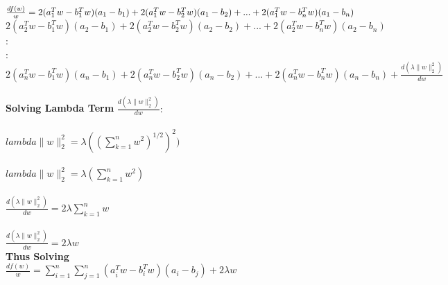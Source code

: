 \documentclass[12pt,letterpaper]{article}
\begin{document}
\begin{enumerate}
                $\frac{df(w)}{w} = \\ \\ 2(a_{1}^Tw - b_{1}^Tw)(a_{1} - b_{1}) + 2(a_{1}^Tw - b_{2}^Tw)(a_{1} - b_{2}) + ... + 2(a_{1}^Tw - b_{n}^Tw)(a_{1} - b_{n})$ \\
                $2(a_{2}^Tw - b_{1}^Tw)(a_{2} - b_{1}) + 2(a_{2}^Tw - b_{2}^Tw)(a_{2} - b_{2}) + ... + 2(a_{2}^Tw - b_{n}^Tw)(a_{2} - b_{n}) $\\
                : \\
                : \\
                $2(a_{n}^Tw - b_{1}^Tw)(a_{n} - b_{1}) + 2(a_{n}^Tw - b_{2}^Tw)(a_{n} - b_{2}) + ... + 2(a_{n}^Tw - b_{n}^Tw)(a_{n} - b_{n}) +  \frac{d(\lambda  \parallel w \parallel_{2}^2)}{dw} $ \\ \\
                \textbf{Solving Lambda Term} $ \frac{d(\lambda  \parallel w \parallel_{2}^2)}{dw}:$ \\ \\
                $ lambda  \parallel w \parallel_{2}^2  = \lambda (( \sum_{k=1}^{n} w^2)^{1/2})^{2})$ \\ \\
                $ lambda  \parallel w \parallel_{2}^2  =\lambda( \sum_{k=1}^{n} w^2)$ \\ \\
                $ \frac{d(\lambda  \parallel w \parallel_{2}^2)}{dw}  =2 \lambda \sum_{k=1}^{n} w$ \\ \\
                $ \frac{d(\lambda  \parallel w \parallel_{2}^2)}{dw}  = 2 \lambda w$ \\
                
                \textbf{Thus Solving} \\
                
                $ \frac{df(w)}{w} = \sum_{i=1}^{n} \sum_{j=1}^{n} (a_{i}^Tw - b_{i}^Tw)(a_{i} - b_{j}) + 2 \lambda w $
    \end{enumerate}
\end{document}
